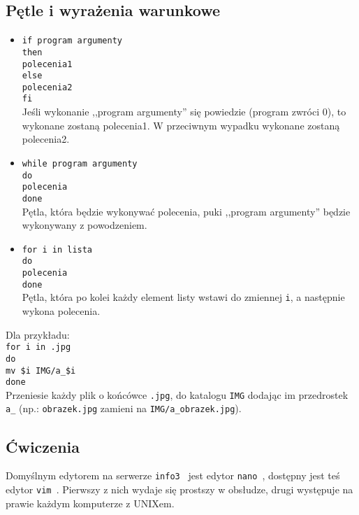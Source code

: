 \documentclass{instrukcja}
\begin{document}
\subsection{Pętle i wyrażenia warunkowe}
\begin{itemize}
\item {\tt if {\red program} {\green argumenty}\\
then\\
{\red polecenia1}\\
else\\
{\red polecenia2}\\
fi}\\
Jeśli wykonanie ,,{\red program} {\green argumenty}'' się powiedzie (program zwróci $0$), to wykonane zostaną {\red polecenia1}. W przeciwnym wypadku wykonane zostaną {\red polecenia2}.
\item {\tt while {\red program} {\green argumenty}\\
do\\
{\red polecenia}\\
done}\\
Pętla, która będzie wykonywać {\red polecenia}, puki ,,{\red program} {\green argumenty}'' będzie wykonywany z powodzeniem.
\item {\tt for i in {\green lista}\\
do\\
{\red polecenia}\\
done}\\
Pętla, która po kolei każdy element {\green list}y wstawi do zmiennej {\tt i}, a następnie wykona {\red polecenia}.
\end{itemize}

Dla przykładu:\\
{\tt for i in {\green *.jpg}\\
do\\
{\red mv} {\green \$i IMG/a\_\$i} \\
done}\\
Przeniesie każdy plik o końcówce {\tt .jpg}, do katalogu {\tt IMG} dodając im przedrostek {\tt a\_} (np.: {\tt obrazek.jpg} zamieni na {\tt IMG/a\_obrazek.jpg}).

\subsection{Ćwiczenia}

Domyślnym edytorem na serwerze {\tt info3 } jest edytor {\tt nano }, dostępny jest teś edytor {\tt vim }. Pierwszy z nich wydaje się prostszy w obsłudze, drugi występuje na prawie każdym komputerze z UNIXem.
\end{document}
